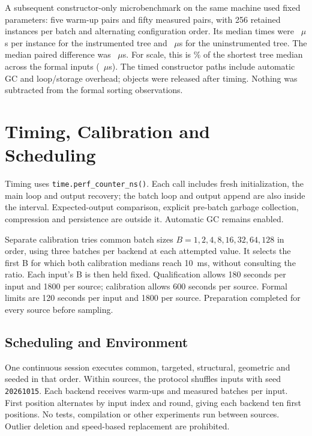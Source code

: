 A subsequent constructor-only microbenchmark on the same machine used fixed
parameters: five warm-up pairs and fifty measured pairs, with 256 retained
instances per batch and alternating configuration order. Its median times
were \UnifiedCtorInstrumented{}~$\mu$s per instance for the instrumented tree
and \UnifiedCtorUninstrumented{}~$\mu$s for the uninstrumented tree. The median
paired difference was \UnifiedCtorDifference{}~$\mu$s. For scale, this is
\UnifiedCtorShortestPercent{}\% of the shortest tree median across the formal
inputs (\UnifiedShortestTreeUs{}~$\mu$s). The timed constructor paths include
automatic GC and loop/storage overhead; objects were released after timing.
Nothing was subtracted from the formal sorting observations.

\section{Timing, Calibration and Scheduling}
\label{sec:method-timing}

Timing uses \nolinkurl{time.perf_counter_ns()}. Each call includes fresh
initialization, the main loop and output recovery; the batch loop and output
append are also inside the interval. Expected-output comparison, explicit
pre-batch garbage collection, compression and persistence are outside it.
Automatic GC remains enabled.

Separate calibration tries common batch sizes
$B=1,2,4,8,16,32,64,128$ in order, using three batches per backend at each
attempted value. It selects the first B for which both calibration medians
reach 10~ms, without consulting the ratio. Each input's B is then held fixed.
Qualification allows 180 seconds per input and 1800 per source; calibration
allows 600 seconds per source. Formal limits are 120 seconds per input and
1800 per source. Preparation completed for every source before sampling.

\subsection{Scheduling and Environment}
\label{sec:method-scheduling}
\label{sec:method-environment}

One continuous session executes common, targeted, structural, geometric and
seeded in that order. Within sources, the protocol shuffles inputs with seed
\texttt{20261015}. Each backend receives \UnifiedWarmups{} warm-ups and
\UnifiedRounds{} measured batches per input. First position alternates by
input index and round, giving each backend ten first positions. No tests,
compilation or other experiments run between sources. Outlier deletion and
speed-based replacement are prohibited.

